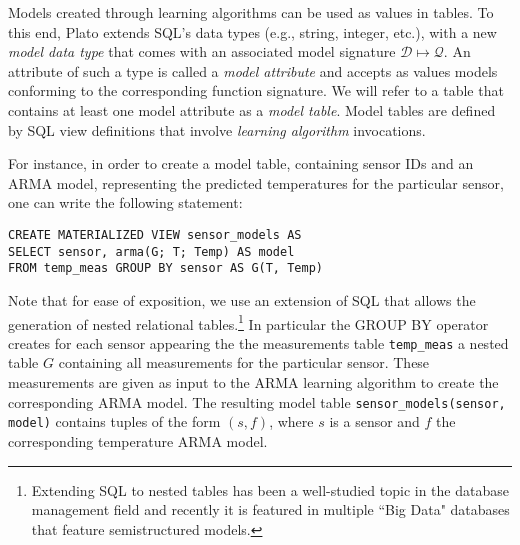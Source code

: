 Models created through learning algorithms can be used as values in tables. To this end, Plato extends SQL's data types (e.g., string, integer, etc.), with a new {\em model data type} that comes with an associated model signature $\mathcal{D}\mapsto \mathcal{Q}$. An attribute of such a type is called a {\em model attribute} and accepts as values models conforming to the corresponding function signature. We will refer to a table that contains at least one model attribute as a {\em model table}. Model tables are defined by SQL view definitions that involve {\em learning algorithm} invocations. 

\vspace*{0.5cm}
\begin{example}
\label{xmpl:models-and-definitions}
For instance, in order to create a model table, containing sensor IDs and an ARMA model, representing the predicted temperatures for the particular sensor, one can write the following statement:

\begin{verbatim}
CREATE MATERIALIZED VIEW sensor_models AS 
SELECT sensor, arma(G; T; Temp) AS model
FROM temp_meas GROUP BY sensor AS G(T, Temp)
\end{verbatim}

Note that for ease of exposition, we use an extension of SQL that allows the generation of nested relational tables.\footnote{Extending SQL to nested tables has been a well-studied topic in the database management field and recently it is featured in multiple ``Big Data" databases that feature semistructured models. 
}
In particular the GROUP BY operator creates for each sensor appearing the the measurements table \texttt{temp\_meas} a nested table $G$ containing all measurements for the particular sensor. These measurements are given as input to the ARMA learning algorithm to create the corresponding ARMA model.
The resulting model table \texttt{sensor\_models(sensor, model)} contains tuples of the form $(s, f)$, where $s$ is a sensor and $f$ the corresponding temperature ARMA model.
\end{example}
\vspace*{0.5cm}

